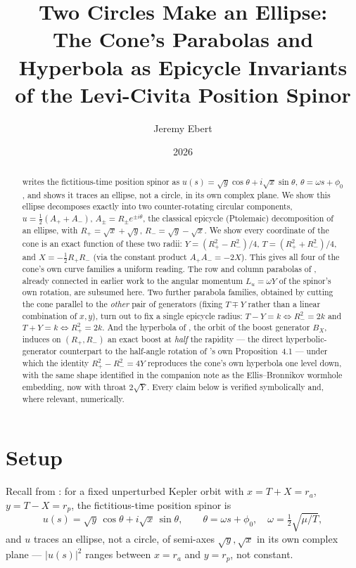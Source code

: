\documentclass[12pt]{amsart}
\title[Epicycle Invariants of the Position Spinor]{Two Circles Make an Ellipse:\\
The Cone's Parabolas and Hyperbola as Epicycle Invariants\\
of the Levi-Civita Position Spinor}
\author{Jeremy Ebert}
\date{2026}
\theoremstyle{plain}
\theoremstyle{remark}
\begin{document}
\maketitle

\begin{abstract}
\cite{Ebert2026LeviCivita} writes the fictitious-time position spinor as $u(s)=\sqrt y\cos\theta+i\sqrt x\sin\theta$, $\theta=\omega s+\phi_0$, and shows it traces an ellipse, not a circle, in its own complex plane. We show this ellipse decomposes exactly into two counter-rotating circular components, $u=\tfrac12(A_++A_-)$, $A_\pm=R_\pm e^{\pm i\theta}$, the classical epicycle (Ptolemaic) decomposition of an ellipse, with $R_+=\sqrt x+\sqrt y$, $R_-=\sqrt y-\sqrt x$. We show every coordinate of the cone is an exact function of these two radii: $Y=(R_+^2-R_-^2)/4$, $T=(R_+^2+R_-^2)/4$, and $X=-\tfrac12R_+R_-$ (via the constant product $A_+A_-=-2X$). This gives all four of the cone's own curve families a uniform reading. The row and column parabolas of \cite{Ebert2026Table}, already connected in earlier work to the angular momentum $L_u=\omega Y$ of the spinor's own rotation, are subsumed here. Two further parabola families, obtained by cutting the cone parallel to the \emph{other} pair of generators (fixing $T\mp Y$ rather than a linear combination of $x,y$), turn out to fix a single epicycle radius: $T-Y=k\iff R_-^2=2k$ and $T+Y=k\iff R_+^2=2k$. And the hyperbola of \cite{Ebert2026Table}, the orbit of the boost generator $B_X$, induces on $(R_+,R_-)$ an exact boost at \emph{half} the rapidity --- the direct hyperbolic-generator counterpart to the half-angle rotation of \cite{Ebert2026LeviCivita}'s own Proposition~4.1 --- under which the identity $R_+^2-R_-^2=4Y$ reproduces the cone's own hyperbola one level down, with the same shape identified in the companion note \cite{Ebert2026Wormhole} as the Ellis--Bronnikov wormhole embedding, now with throat $2\sqrt Y$. Every claim below is verified symbolically and, where relevant, numerically.
\end{abstract}

\section{Setup}

Recall from \cite{Ebert2026LeviCivita}: for a fixed unperturbed Kepler orbit with $x=T+X=r_a$, $y=T-X=r_p$, the fictitious-time position spinor is
\begin{equation}
u(s)=\sqrt y\,\cos\theta+i\sqrt x\,\sin\theta, \qquad \theta=\omega s+\phi_0,\quad \omega=\tfrac12\sqrt{\mu/T}, \tag{1}
\end{equation}
and $u$ traces an ellipse, not a circle, of semi-axes $\sqrt y,\sqrt x$ in its own complex plane --- $|u(s)|^2$ ranges between $x=r_a$ and $y=r_p$, not constant.
\end{document}
